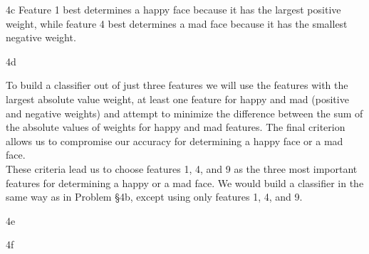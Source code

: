 \documentclass{article}
\begin{document}
\begin{homeworkProblem}
\begin{homeworkSection}{4c}
        Feature 1 best determines a happy face because it has the largest
        positive weight, while feature 4 best determines a mad face because it
        has the smallest negative weight. 

    \end{homeworkSection}

    \begin{homeworkSection}{4d}
        
        To build a classifier out of just three features we will use the
        features with the largest absolute value weight, at least one feature
        for happy and mad (positive and negative weights) and attempt to
        minimize the difference between the sum of the absolute values of
        weights for happy and mad features. The final criterion allows us to
        compromise our accuracy for determining a happy face or a mad face. \\

        These criteria lead us to choose features 1, 4, and 9 as the three most
        important features for determining a happy or a mad face. We would
        build a classifier in the same way as in Problem \S 4b, except using
        only features 1, 4, and 9.

    \end{homeworkSection}
    
    \begin{homeworkSection}{4e}

    \end{homeworkSection}
    
    \begin{homeworkSection}{4f}

    \end{homeworkSection}

\end{homeworkProblem}
\end{document}

